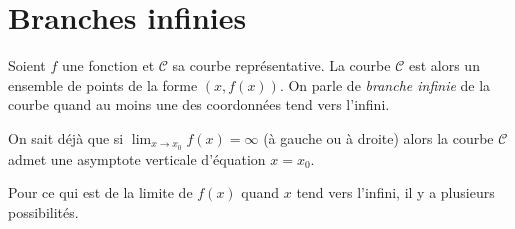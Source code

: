 \section{Branches infinies}
      Soient $f$ une fonction et $\mathscr{C}$ sa courbe repr\'esentative.
      La courbe $\mathscr{C}$ est alors un ensemble de points de la forme $(x,f(x))$.
      On parle de \emph{branche infinie} de la courbe quand au moins une des coordonn\'ees tend vers l'infini.
            
      On sait d\'ej\`a que si $\lim_{x\rightarrow x_0} f(x) = \infty$ (\`a gauche ou \`a droite) alors 
      la courbe $\mathscr{C}$ admet une asymptote verticale d'\'equation $x=x_0$.
      
      Pour ce qui est de la limite de $f(x)$ quand $x$ tend vers l'infini, il y a plusieurs possibilit\'es.
